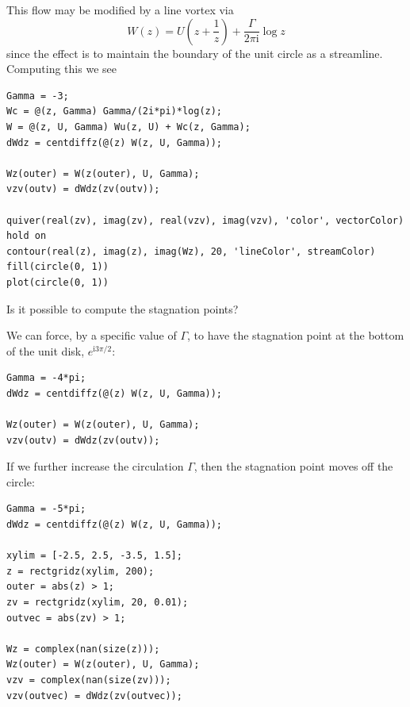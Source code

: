 \documentclass[12pt,fleqn]{article}
\renewcommand{\i}{\mathrm{i}}
\begin{document}
This flow may be modified by a line vortex via
\begin{equation*}
  W(z) = U\left( z + \frac{1}{z} \right) + \frac{\Gamma}{2\pi\i}\log z
\end{equation*}
since the effect is to maintain the boundary of the unit circle as a streamline.
Computing this we see
\begin{lstlisting}
Gamma = -3;
Wc = @(z, Gamma) Gamma/(2i*pi)*log(z);
W = @(z, U, Gamma) Wu(z, U) + Wc(z, Gamma);
dWdz = centdiffz(@(z) W(z, U, Gamma));

Wz(outer) = W(z(outer), U, Gamma);
vzv(outv) = dWdz(zv(outv));

quiver(real(zv), imag(zv), real(vzv), imag(vzv), 'color', vectorColor)
hold on
contour(real(z), imag(z), imag(Wz), 20, 'lineColor', streamColor)
fill(circle(0, 1))
plot(circle(0, 1))
\end{lstlisting}
Is it possible to compute the stagnation points?

We can force, by a specific value of $\Gamma$, to have the stagnation point at the bottom of the unit disk, $e^{\i 3\pi/2}$:
\begin{lstlisting}
Gamma = -4*pi;
dWdz = centdiffz(@(z) W(z, U, Gamma));

Wz(outer) = W(z(outer), U, Gamma);
vzv(outv) = dWdz(zv(outv));
\end{lstlisting}

If we further increase the circulation $\Gamma$, then the stagnation point moves off the circle:
\begin{lstlisting}
Gamma = -5*pi;
dWdz = centdiffz(@(z) W(z, U, Gamma));

xylim = [-2.5, 2.5, -3.5, 1.5];
z = rectgridz(xylim, 200);
outer = abs(z) > 1;
zv = rectgridz(xylim, 20, 0.01);
outvec = abs(zv) > 1;

Wz = complex(nan(size(z)));
Wz(outer) = W(z(outer), U, Gamma);
vzv = complex(nan(size(zv)));
vzv(outvec) = dWdz(zv(outvec));
\end{lstlisting}
\end{document}
